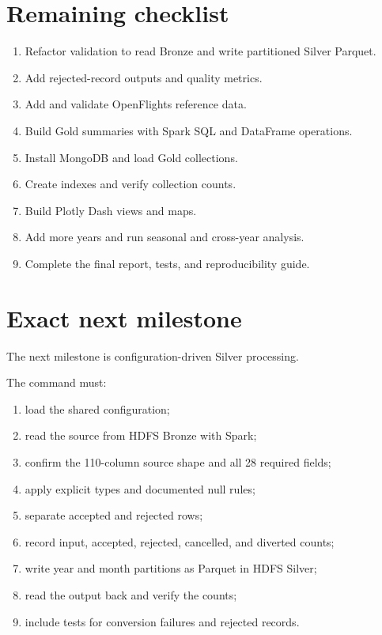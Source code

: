 \documentclass[11pt,a4paper]{article}
\begin{document}
\section{Remaining checklist}

\begin{enumerate}[leftmargin=*]
  \item Refactor validation to read Bronze and write partitioned Silver Parquet.
  \item Add rejected-record outputs and quality metrics.
  \item Add and validate OpenFlights reference data.
  \item Build Gold summaries with Spark SQL and DataFrame operations.
  \item Install MongoDB and load Gold collections.
  \item Create indexes and verify collection counts.
  \item Build Plotly Dash views and maps.
  \item Add more years and run seasonal and cross-year analysis.
  \item Complete the final report, tests, and reproducibility guide.
\end{enumerate}

\section{Exact next milestone}

The next milestone is configuration-driven Silver processing.

The command must:

\begin{enumerate}[leftmargin=*]
  \item load the shared configuration;
  \item read the source from HDFS Bronze with Spark;
  \item confirm the 110-column source shape and all 28 required fields;
  \item apply explicit types and documented null rules;
  \item separate accepted and rejected rows;
  \item record input, accepted, rejected, cancelled, and diverted counts;
  \item write year and month partitions as Parquet in HDFS Silver;
  \item read the output back and verify the counts;
  \item include tests for conversion failures and rejected records.
\end{enumerate}
\end{document}
